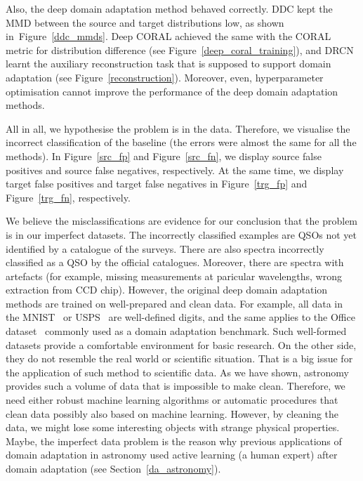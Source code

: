 Also, the deep domain adaptation method behaved correctly.
DDC kept the MMD between the source and target distributions low,
as shown in~Figure~\ref{ddc_mmds}.
Deep CORAL achieved the same with the CORAL metric for distribution difference
(see Figure~\ref{deep_coral_training}),
and DRCN learnt the auxiliary reconstruction task
that is supposed to support domain adaptation
(see Figure~\ref{reconstruction}).
Moreover, even, hyperparameter optimisation cannot improve the performance of the deep domain adaptation methods.

All in all, we hypothesise the problem is in the data.
Therefore, we visualise the incorrect classification of the baseline
(the errors were almost the same for all the methods).
In Figure~\ref{src_fp} and Figure~\ref{src_fn}, we display source false positives and source false negatives, respectively.
At the same time, we display target false positives and target false negatives in Figure~\ref{trg_fp} and Figure~\ref{trg_fn}, respectively.

We believe the misclassifications are evidence for our conclusion
that the problem is in our imperfect datasets.
The incorrectly classified examples are QSOs not yet identified by a catalogue of the surveys.
There are also spectra incorrectly classified as a QSO by the official catalogues.
Moreover, there are spectra with artefacts
(for example, missing measurements at paricular wavelengths, wrong extraction from CCD chip). 
However, the original deep domain adaptation methods are trained on well-prepared and clean data.
For example, all data in the MNIST~\cite{lecun1998} or USPS~\cite{hull1994} are well-defined digits,
and the same applies to the Office dataset~\cite{saenko2010} commonly used as a domain adaptation benchmark.
Such well-formed datasets provide a comfortable environment for basic research.
On the other side, they do not resemble the real world or scientific situation.
That is a big issue for the application of such method to scientific data.
As we have shown, astronomy provides such a volume of data that is impossible to make clean.
Therefore, we need either robust machine learning algorithms
or automatic procedures that clean data possibly also based on machine learning.
However, by cleaning the data, we might lose some interesting objects with strange physical properties.
Maybe, the imperfect data problem is the reason
why previous applications of domain adaptation in astronomy used active learning (a human expert)
after domain adaptation (see Section~\ref{da_astronomy}).

